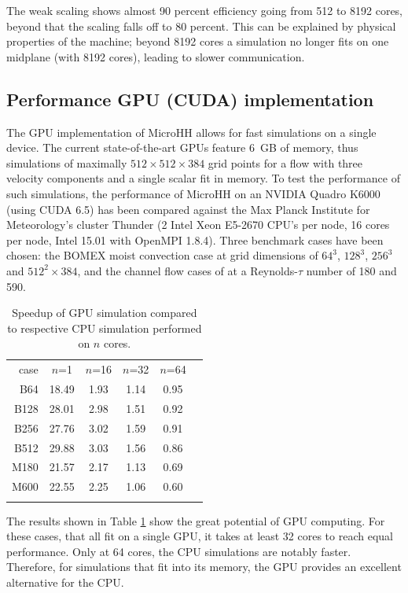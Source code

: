 \documentclass[gmd]{copernicus}
\begin{document}
The weak scaling shows almost 90 percent efficiency going from 512 to 8192 cores, beyond that the scaling falls off to 80 percent. This can be explained by physical properties of the machine;  beyond 8192 cores a simulation no longer fits on one midplane (with 8192 cores), leading to slower communication.

\subsection{Performance GPU (CUDA) implementation}
The GPU implementation of MicroHH allows for fast simulations on a single device. The current state-of-the-art GPUs feature 6~GB of memory, thus simulations of maximally $512 \times 512 \times 384$ grid points for a flow with three velocity components and a single scalar fit in memory. To test the performance of such simulations, the performance of MicroHH on an NVIDIA Quadro K6000 (using CUDA 6.5) has been compared against the Max Planck Institute for Meteorology's cluster Thunder (2 Intel Xeon E5-2670 CPU's per node, 16 cores per node, Intel 15.01 with OpenMPI 1.8.4). Three benchmark cases have been chosen: the BOMEX moist convection case at grid dimensions of $64^3$, $128^3$, $256^3$ and $512^2 \times 384$, and the channel flow cases of \citet{Moser1999} at a Reynolds-$\tau$ number of 180 and 590.

\begin{table}[t]
	\caption{Speedup of GPU simulation compared to respective CPU simulation performed on $n$ cores.}\label{tab:gpu}
	\begin{tabular}{rccccc}
		\tophline
		case & $n$=1 & $n$=16 & $n$=32 & $n$=64   \\
		\middlehline
		B64  & 18.49 & 1.93 & 1.14 & 0.95 \\
		B128 & 28.01 & 2.98 & 1.51 & 0.92 \\
		B256 & 27.76 & 3.02 & 1.59 & 0.91 \\
		B512 & 29.88 & 3.03 & 1.56 & 0.86 \\
		\middlehline
		M180 & 21.57 & 2.17 & 1.13 & 0.69 \\
		M600 & 22.55 & 2.25 & 1.06 & 0.60 \\
		\bottomhline
	\end{tabular}
\end{table}

The results shown in Table \ref{tab:gpu} show the great potential of GPU computing. For these cases, that all fit on a single GPU, it takes at least 32 cores to reach equal performance. Only at 64 cores, the CPU simulations are notably faster. Therefore, for simulations that fit into its memory, the GPU provides an excellent alternative for the CPU.
\end{document}

